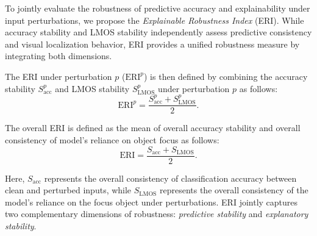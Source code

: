 \documentclass[a4paper,fleqn]{cas-dc}
\begin{document}
	
	To jointly evaluate the robustness of predictive accuracy and explainability under input perturbations, we propose the \textit{Explainable Robustness Index} (ERI). 
	While accuracy stability and LMOS stability independently assess predictive consistency and visual localization behavior, ERI provides a unified robustness measure by integrating both dimensions.
	
	
	
	The ERI under perturbation $p$ ($\mathrm{ERI}^p$) is then defined by combining the accuracy stability $S_{\mathrm{acc}}^{p}$ and LMOS stability $S_{\mathrm{LMOS}}^p$ under perturbation $p$ as follows:
	\begin{equation}
		\label{eq:eri_p}
		\mathrm{ERI}^p =\frac{S_{\mathrm{acc}}^{p}+
			S_{\mathrm{LMOS}}^p}{2}.
	\end{equation}

    The overall ERI is defined as the mean of overall accuracy stability and overall consistency of model's reliance on object focus as follows:
     \begin{equation}
		\label{eq:eri}
		\mathrm{ERI} =\frac{S_{\mathrm{acc}}+
			S_{\mathrm{LMOS}}}{2}.
	\end{equation}
    
	Here, $S_{\mathrm{acc}}$ represents the overall consistency of classification accuracy between clean and perturbed inputs, while $S_{\mathrm{LMOS}}$ represents the overall consistency of the model's reliance on the focus object under perturbations. 
	ERI jointly captures two complementary dimensions of robustness: \textit{predictive stability} and \textit{explanatory stability}.
	
\end{document}
